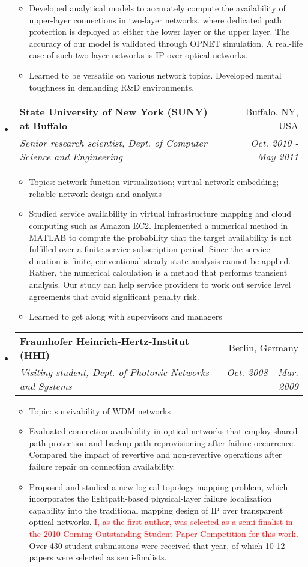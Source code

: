 \documentclass[letterpaper,11pt]{article}
\makeatletter
\newcommand{\ressubheading}[4]{
\begin{tabular*}{6.69in}{l@{\extracolsep{\fill}}r}
        \textbf{#1} & #2 \\
        \textit{#3} & \textit{#4} \\
\end{tabular*}\vspace{-6pt}
}
\newcommand{\resitem}[1]{\item #1 \vspace{-2pt}}
\makeatother
\begin{document}
\begin{CJK}{UTF8}{gbsn}
\begin{itemize}
\begin{itemize}
        \resitem{Developed analytical models to accurately compute the availability of upper-layer connections in two-layer networks,
        where dedicated path protection is deployed at either the lower layer or the upper layer.
        The accuracy of our model is validated through OPNET simulation. A real-life case of such two-layer networks is IP over optical networks.}
        \resitem{Learned to be versatile on various network topics. Developed mental toughness in demanding R\&D environments.}
    \end{itemize}

\item
    \ressubheading{State University of New York (SUNY) at Buffalo}{Buffalo, NY, USA} %
    {Senior research scientist, Dept. of Computer Science and Engineering}{Oct. 2010 - May 2011} %
    \begin{itemize}
        \resitem{Topics: network function virtualization; virtual network embedding; reliable network design and analysis}
        \resitem{Studied service availability in virtual infrastructure mapping and cloud computing such as Amazon EC2.
        Implemented a numerical method in MATLAB to compute the probability that the target availability is not fulfilled over a finite service subscription period.
        Since the service duration is finite, conventional steady-state analysis cannot be applied.
        Rather, the numerical calculation is a method that performs transient analysis.
        Our study can help service providers to work out service level agreements that avoid significant penalty risk.}
        \resitem{Learned to get along with supervisors and managers}
    \end{itemize}

\item
    \ressubheading{Fraunhofer Heinrich-Hertz-Institut (HHI)}{Berlin, Germany}%
    {Visiting student, Dept. of Photonic Networks and Systems}{Oct. 2008 - Mar. 2009} %
    \begin{itemize}
        \resitem{Topic: survivability of WDM networks}
        \resitem{Evaluated connection availability in optical networks that employ shared path protection and backup path reprovisioning after failure occurrence.
        Compared the impact of revertive and non-revertive operations after failure repair on connection availability.}
        \resitem{Proposed and studied a new logical topology mapping problem, which incorporates the lightpath-based physical-layer failure localization capability
        into the traditional mapping design of IP over transparent optical networks.
        \textcolor{Red}{I, as the first author, was selected as a semi-finalist in the 2010 Corning Outstanding Student Paper Competition for this work.}
        Over 430 student submissions were received that year, of which 10-12 papers were selected as semi-finalists.}
    \end{itemize}


\end{itemize}
\end{CJK}
\end{document}
